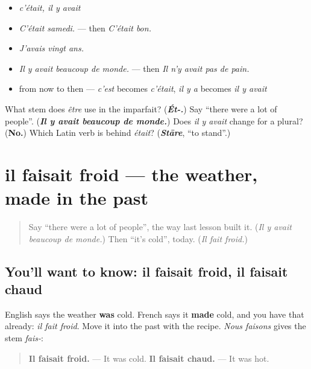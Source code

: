 \begin{itemize}
\raggedright
  \item \emph{c'était, il y avait}
  \item \emph{C'était samedi.} — then \emph{C'était bon.}
  \item \emph{J'avais vingt ans.}
  \item \emph{Il y avait beaucoup de monde.} — then \emph{Il n'y avait pas de pain.}
  \item from now to then — \emph{c'est} becomes \emph{c'était}, \emph{il y a} becomes \emph{il y avait}
\end{itemize}

\begin{tcolorbox}[breakable,colback=teal!4,colframe=teal!35!black,title={Before you move on}]
What stem does \emph{être} use in the imparfait? (\emph{\textbf{Ét-.}}) Say \textquotedblleft{}there were a lot of people\textquotedblright{}. (\emph{\textbf{Il y avait beaucoup de monde.}}) Does \emph{il y avait} change for a plural? (\textbf{No.}) Which Latin verb is behind \emph{était}? (\emph{\textbf{Stāre}}, \textquotedblleft{}to stand\textquotedblright{}.)
\end{tcolorbox}
\section[il faisait froid, il faisait chaud]{il faisait froid — the weather, made in the past}

\label{lesson:FR-C258-il-faisait-froid}



\begin{quote}
Say \textquotedblleft{}there were a lot of people\textquotedblright{}, the way last lesson built it. (\emph{Il y avait beaucoup de monde.}) Then \textquotedblleft{}it's cold\textquotedblright{}, today. (\emph{Il fait froid.})
\end{quote}

\subsection*{You'll want to know: il faisait froid, il faisait chaud}
English says the weather \textbf{was} cold. French says it \textbf{made} cold, and you have that already: \emph{il fait froid}. Move it into the past with the recipe. \emph{Nous faisons} gives the stem \emph{fais-}:

\begin{quote}
\textbf{Il faisait froid.} — It was cold. \textbf{Il faisait chaud.} — It was hot.
\end{quote}

